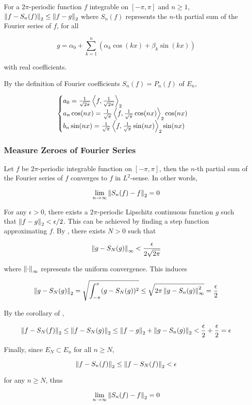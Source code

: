 \documentclass[a4paper,12pt]{article}
\begin{document}
\begin{crl}
  For a $2\pi$-periodic function $f$ integrable on $[-\pi,\pi]$ and $n\geq 1$, $\left\| f-S_{n}(f)\right\|_{2}\leq\left\| f-g\right\|_{2}$ where $S_{n}(f)$ represents the $n$-th partial sum of the Fourier series of $f$, for all

  $$g=\alpha_{0}+\sum_{k=1}^{n}(\alpha_{k}\cos(kx)+\beta_{k}\sin(kx))$$\s

  with real coefficients.\n

  \prf By the definition of Fourier coefficients $S_{n}(f)=P_{n}(f)$ of $E_{n}$,

  $$\begin{cases}
    a_{0}=\frac{1}{\sqrt{2\pi}}\left\langle f,\frac{1}{\sqrt{2\pi}}\right\rangle_{2}\\
    a_{n}\cos(nx)=\frac{1}{\sqrt{\pi}}\left\langle f,\frac{1}{\sqrt{\pi}}\cos(nx)\right\rangle_{2}\cos(nx)\\
    b_{n}\sin(nx)=\frac{1}{\sqrt{\pi}}\left\langle f,\frac{1}{\sqrt{\pi}}\sin(nx)\right\rangle_{2}\sin(nx)
  \end{cases}$$
\end{crl}

\propdisp
\subsubsection{Measure Zeroes of Fourier Series}
\begin{thm}
  Let $f$ be $2\pi$-periodic integrable function on $[-\pi,\pi]$, then the $n$-th partial sum of the Fourier series of $f$ converges to $f$ in $L^{2}$-sense. In other words,

  $$\lim_{n\to\infty}\left\| S_{n}(f)-f\right\|_{2}=0$$\s

  \prf For any $\epsilon>0$, there exists a $2\pi$-periodic Lipschitz continuous function $g$ such that $\left\| f-g\right\|_{2}<\epsilon/2$. This can be achieved by finding a step function approximating $f$. By \rpst[\sctr{11}], there exists $N>0$ such that

  $$\left\| g-S_{N}(g)\right\|_{\infty}<\frac{\epsilon}{2\sqrt{2\pi}}$$\s

  where $\left\| \cdot\right\|_{\infty}$ represents the uniform convergence. This induces

  $$\left\| g-S_{N}(g)\right\|_{2}=\sqrt{\int_{-\pi}^{\pi}(g-S_{N}(g))^{2}}\leq\sqrt{2\pi\left\| g-S_{n}(g)\right\|_{\infty}^{2}}=\frac{\epsilon}{2}$$\s

  By the corollary of \rpst[\sctr{1}],

  $$\left\| f-S_{N}(f)\right\|_{2}\leq\left\| f-S_{N}(g)\right\|_{2}\leq\left\| f-g\right\|_{2}+\left\| g-S_{n}(g)\right\|_{2}<\frac{\epsilon}{2}+\frac{\epsilon}{2}=\epsilon$$\s

  Finally, since $E_{N}\subset E_{n}$ for all $n\geq N$,

  $$\left\| f-S_{n}(f)\right\|_{2}\leq\left\| f-S_{N}(f)\right\|_{2}<\epsilon$$\s

  for any $n\geq N$, thus

  $$\lim_{n\to\infty}\left\| S_{n}(f)-f\right\|_{2}=0$$
\end{thm}\n
\end{document}
